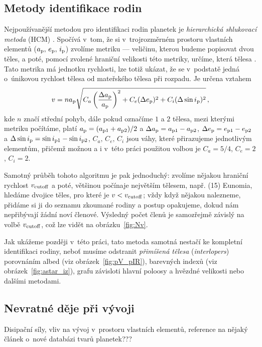 \documentclass[A4paper, 12pt, oneside]{book}
\newcommand{\I}[1]{\textit{#1}}
\begin{document}
\subsection{Metody identifikace rodin}
Nejpoužívanější metodou pro identifikaci rodin planetek je \I{hierarchická shlukovací metoda} (HCM) \cite{zappala90}. Spočívá v~tom, že si v~trojrozměrném prostoru vlastních elementů ($a_{\rm p},\,e_{\rm p},\,i_{\rm p}$) zvolíme metriku --- veličinu, kterou budeme popisovat  dvou těles, a poté, pomocí zvolené hraniční velikosti této metriky, určíme, která tělesa . Tato metrika má jednotku rychlosti, lze totiž ukázat, že se v~podstatě jedná o~únikovou rychlost tělesa od mateřského tělesa při rozpadu. Je určena vztahem
\begin{align}
	v=na_{\rm p}\sqrt{C_a\left(\frac{\Delta a_{\rm p}}{a_{\rm p}}\right)^2+C_e(\Delta e_{\rm p})^2+C_i(\Delta \sin i_{\rm p})^2}\,,
\end{align}
kde $n$ značí střední pohyb, dále pokud označíme $1$ a $2$ tělesa, mezi kterými metriku počítáme, platí $a_{\rm p}=(a_{{\rm p}1}+a_{{\rm p}2})/2$ a $\Delta a_{\rm p}=a_{{\rm p}1}-a_{{\rm p}2}$, $\Delta e_{\rm p}=e_{{\rm p}1}-e_{{\rm p}2}$ a $\Delta \sin i_{\rm p}=\sin i_{{\rm p}1}-\sin i_{{\rm p}2}$, $C_a,\,C_e,\,C_i$ jsou váhy, které přirazujeme jednotlivým elementům, přičemž možnou a i v~této práci použitou volbou je $C_a=5/4$, $C_e=2$, $C_i=2$. 

Samotný průběh tohoto algoritmu je pak jednoduchý: zvolíme nějakou hraniční rychlost $v_{\rm cutoff}$ a poté, většinou počínaje největším tělesem, např. (15) Eunomia, hledáme dvojice těles, pro které je $v<v_{\rm cutoff}$; vždy když nějakou nalezneme, přidáme si ji do seznamu zkoumané rodiny a postup opakujeme, dokud nám nepřibývají žádní noví členové. Výsledný počet členů je samozřejmě závislý na volbě $v_{\rm cutoff}$, což lze vidět na obrázku~\ref{fig:Nv}.

Jak ukážeme později v~této práci, tato metoda samotná nestačí ke kompletní identifikaci rodiny, neboť musíme odstranit \I{přimíšená tělesa} (\I{interlopers}) porovnáním albed (viz obrázek~\ref{fig:pV_pIR}), barevných indexů (viz obrázek~\ref{fig:astar_iz}), grafu závisloti hlavní poloosy a hvězdné velikosti nebo dalšími metodami. 

\subsection{Nevratné děje při vývoji}
Disipační síly, vliv na vývoj v~prostoru vlastních elementů, reference na nějaký článek o~nové databázi tvarů planetek???
\end{document}
